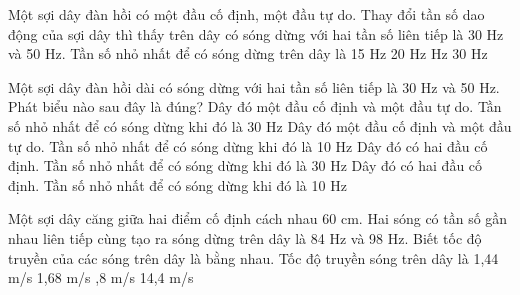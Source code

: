 \begin{ex}%
Một sợi dây đàn hồi có một đầu cố định, một đầu tự do. Thay đổi tần số dao động của sợi dây thì thấy trên dây có sóng dừng với hai tần số liên tiếp là 30 Hz và 50 Hz. Tần số nhỏ nhất để có sóng dừng trên dây là
\choice
{15 Hz}
{20 Hz}
{ Hz}
{30 Hz}
\end{ex} 
\begin{ex}%
Một sợi dây đàn hồi dài có sóng dừng với hai tần số liên tiếp là 30 Hz và 50 Hz. Phát biểu nào sau đây là đúng?
\choice
{Dây đó một đầu cố định và một đầu tự do. Tần số nhỏ nhất để có sóng dừng khi đó là 30 Hz}
{\True Dây đó một đầu cố định và một đầu tự do. Tần số nhỏ nhất để có sóng dừng khi đó là 10 Hz}
{Dây đó có hai đầu cố định. Tần số nhỏ nhất để có sóng dừng khi đó là 30 Hz}
{Dây đó có hai đầu cố định. Tần số nhỏ nhất để có sóng dừng khi đó là 10 Hz}
\end{ex} 
\begin{ex}%
Một sợi dây căng giữa hai điểm cố định cách nhau 60 cm. Hai sóng có tần số gần nhau liên tiếp cùng tạo ra sóng dừng trên dây là 84 Hz và 98 Hz. Biết tốc độ truyền của các sóng trên dây là bằng nhau. Tốc độ truyền sóng trên dây là
\choice
{1,44 m/s}
{1,68 m/s}
{,8 m/s}
{14,4 m/s}
\end{ex} 

